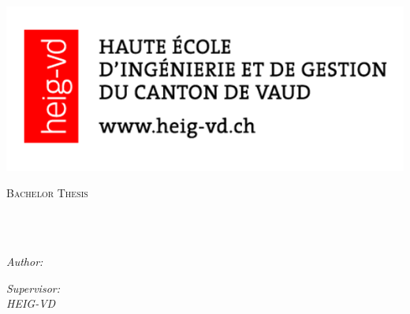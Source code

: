 \documentclass[
11pt, %
english, %
singlespacing, %
headsepline, %
]{MastersDoctoralThesis} %
\author{\textcolor{bleu}{Arthur \textsc{Passuello}}} %
\begin{document}
\frontmatter %

\pagestyle{plain} %


\begin{titlepage}

\vspace*{-20mm}
\includegraphics[scale = 0.5]{Figures/heigvd_logo.png}
\begin{center}
\textsc{\Large Bachelor Thesis}\\[0.5cm] %

\HRule \\[0.4cm] %
{\huge \bfseries \ttitle\par}\vspace{0.4cm} %
\HRule \\[1.5cm] %
\begin{minipage}[t]{0.4\textwidth}
\begin{flushleft} \large
\emph{Author:}\\
\href{http://www.johnsmith.com}{\authorname} %
\end{flushleft}
\end{minipage}
\begin{minipage}[t]{0.4\textwidth}
\begin{flushright} \large
\emph{Supervisor:} \\
\href{http://www.jamessmith.com}{\textcolor{red}{\supname}} \linebreak
\textit{\small{HEIG-VD}} \linebreak  %


\end{flushright}
\end{minipage}
\end{center}
\end{titlepage}
\end{document}
